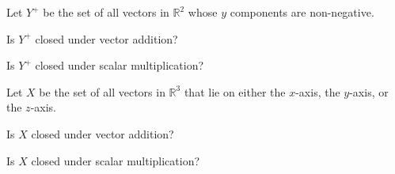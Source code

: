 \documentclass{ximera}
\newcommand{\RR}{\mathbb{R}}
\begin{document}
\begin{problem}\label{pr:Y^+}
Let $Y^+$ be the set of all vectors in $\mathbb{R}^2$ whose $y$ components are non-negative.    
 \begin{problem}
 Is $Y^+$ closed under vector addition?
 
 \begin{multipleChoice}
 \end{multipleChoice}
 
 \end{problem}
 
 \begin{problem}
 Is $Y^+$ closed under scalar multiplication?
 
  \begin{multipleChoice}
 \end{multipleChoice}
 
   \end{problem}
\end{problem}


\begin{problem}\label{pr:R^3axes}
 Let $X$ be the set of all vectors in $\RR^3$ that lie on either the $x$-axis, the $y$-axis, or the $z$-axis.    
 	\begin{problem}
  Is $X$ closed under vector addition?
  
  \begin{multipleChoice}
 \end{multipleChoice}
 
 	\end{problem}
 	\begin{problem}
 Is $X$ closed under scalar multiplication?
 
 \begin{multipleChoice}
 \end{multipleChoice}
 	\end{problem}
 \end{problem}
\end{document}
